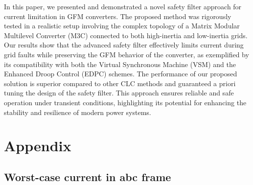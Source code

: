 \documentclass[lettersize,journal]{IEEEtran}
\begin{document}
In this paper, we presented and demonstrated a novel safety filter approach for current limitation in GFM converters.
The proposed method was rigorously tested in a realistic setup involving the complex topology of a Matrix Modular Multilevel Converter (M3C) connected to both high-inertia and low-inertia grids. 
Our results show that the advanced safety filter effectively limits current during grid faults while preserving the GFM behavior of the converter, as exemplified by its compatibility with both the Virtual Synchronous Machine (VSM) and the Enhanced Droop Control (EDPC) schemes.
The performance of our proposed solution is superior compared to other CLC methods and guaranteed a priori tuning the design of the safety filter.
This approach ensures reliable and safe operation under transient conditions, highlighting its potential for enhancing the stability and resilience of modern power systems.



\section{Appendix}

\subsection{Worst-case current in abc frame} \label{sec:worst_case_abc}
\end{document}
